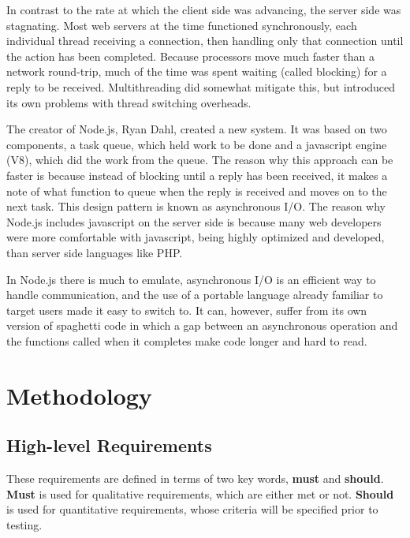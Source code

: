 \documentclass{article}
\begin{document}
In contrast to the rate at which the client side was advancing, the server side was stagnating. Most web servers at the time functioned synchronously, each individual thread receiving a connection, then handling only that connection until the action has been completed. Because processors move much faster than a network round-trip, much of the time was spent waiting (called blocking) for a reply to be received. Multithreading did somewhat mitigate this, but introduced its own problems with thread switching overheads.

The creator of Node.js, Ryan Dahl, created a new system. It was based on two components, a task queue, which held work to be done and a javascript engine (V8), which did the work from the queue. The reason why this approach can be faster is because instead of blocking until a reply has been received, it makes a note of what function to queue when the reply is received and moves on to the next task. This design pattern is known as asynchronous I/O\cite{async}. The reason why Node.js includes javascript on the server side is because many web developers were more comfortable with javascript, being highly optimized and developed, than server side languages like PHP. 

In Node.js there is much to emulate, asynchronous I/O is an efficient way to handle communication, and the use of a portable language already familiar to target users made it easy to switch to. It can, however, suffer from its own version of spaghetti code in which a gap between an asynchronous operation and the functions called when it completes make code longer and hard to read.

\section{Methodology}
\subsection{High-level Requirements}
These requirements are defined in terms of two key words, \textbf{must} and \textbf{should}. \textbf{Must} is used for qualitative requirements, which are either met or not. \textbf{Should} is used for quantitative requirements, whose criteria will be specified prior to testing.
\end{document}
